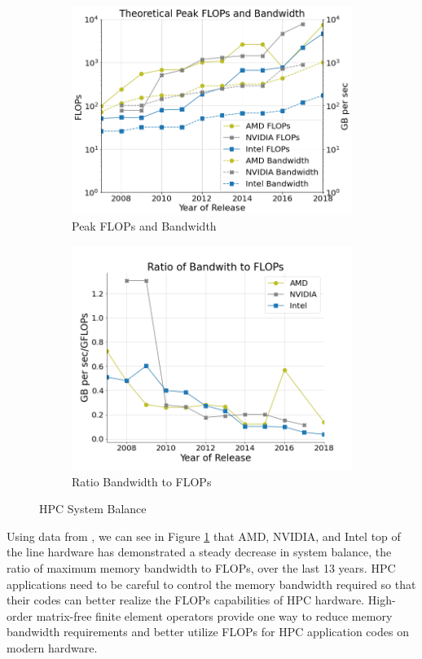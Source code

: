 \begin{figure}[ht!]
\begin{subfigure}{.49\textwidth}
\includegraphics[width=.99\linewidth]{../img/peakFlopsAndBandwidth}
\caption{Peak FLOPs and Bandwidth}
\end{subfigure}
\begin{subfigure}{.49\textwidth}
\includegraphics[width=.99\linewidth]{../img/peakRatio}
\caption{Ratio Bandwidth to FLOPs}
\end{subfigure}
\caption{HPC System Balance}
\label{fig:peakratio}
\end{figure}

Using data from \cite{kruppcomparison}, we can see in Figure \ref{fig:peakratio} that AMD, NVIDIA, and Intel top of the line hardware has demonstrated a steady decrease in system balance, the ratio of maximum memory bandwidth to FLOPs, over the last 13 years.
HPC applications need to be careful to control the memory bandwidth required so that their codes can better realize the FLOPs capabilities of HPC hardware.
High-order matrix-free finite element operators provide one way to reduce memory bandwidth requirements and better utilize FLOPs for HPC application codes on modern hardware.